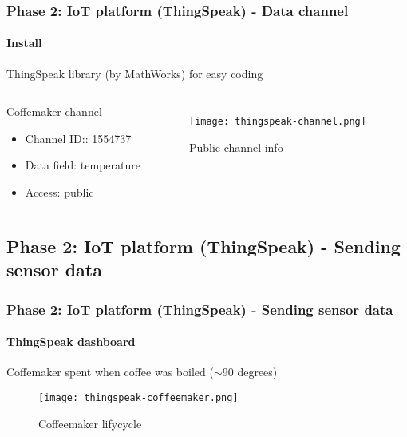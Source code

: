 \documentclass[
    aspectratio=169,                   %
]{beamer}
\begin{document}
    \begin{frame}
        \frametitle{Phase 2: IoT platform (ThingSpeak) - Data channel}

        \paragraph{Install} ThingSpeak library (by MathWorks) for easy coding

        \begin{columns}[T,onlytextwidth]
              \begin{block}{Coffemaker channel}
                \begin{itemize}
                    \item \alert{Channel ID:}: 1554737
                    \item \alert{Data field}: temperature
                    \item \alert{Access}: public\cite{thingspeakchannel}
                \end{itemize}
              \end{block}
            \begin{figure}
                \centering
                \begin{stampbox}
                    \texttt{[image: thingspeak-channel.png]}
                \end{stampbox}
                \caption{Public channel info}
            \end{figure}        
        \end{columns}

    \end{frame}

\subsection{Phase 2: IoT platform (ThingSpeak) - Sending sensor data}

    \begin{frame}
        \frametitle{Phase 2: IoT platform (ThingSpeak) - Sending sensor data}

        \paragraph{ThingSpeak dashboard} Coffemaker spent when coffee was boiled ($\sim$90 degrees)

        \begin{figure}
            \centering
            \begin{stampbox}
                \texttt{[image: thingspeak-coffeemaker.png]}
            \end{stampbox}
            \caption{Coffeemaker lifycycle}
        \end{figure}
        
    \end{frame}
\end{document}
